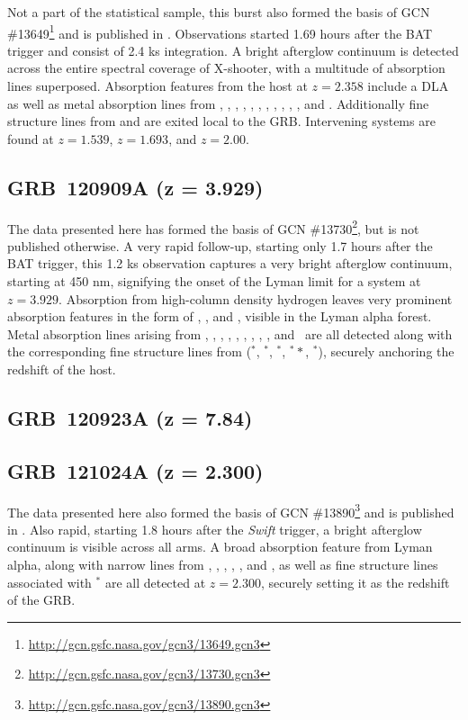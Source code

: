 \documentclass{aa}    %
\begin{document}
Not a part of the statistical sample, this burst also formed the basis of  GCN
\#13649\footnote{\url{http://gcn.gsfc.nasa.gov/gcn3/13649.gcn3}} and is
published in \citet{Kruhler2013}. Observations started 1.69 hours after the BAT
trigger and consist of 2.4 ks integration. A bright afterglow continuum is
detected across the entire spectral coverage of X-shooter, with a multitude of
absorption lines superposed. Absorption features from the host at $z = 2.358$
include a DLA as well as metal absorption lines from \nv, \sii, \SIii, \oi,
\civ, \SIiv, \feii, \alii, \aliii, \mnii, \mgii, and \mgi. Additionally fine
structure lines from \NIii and \feii are exited local to the GRB. Intervening
systems are found at $z = 1.539$, $z = 1.693$, and $z = 2.00$.

\subsection{GRB~120909A (z = 3.929)}

The data presented here has formed the basis of GCN
\#13730\footnote{\url{http://gcn.gsfc.nasa.gov/gcn3/13730.gcn3}}, but is not
published otherwise. A very rapid follow-up, starting only 1.7 hours after the
BAT trigger, this 1.2 ks observation captures a very bright afterglow continuum,
starting at 450 nm, signifying the onset of the Lyman limit for a system at $z =
3.929$. Absorption from high-column density hydrogen leaves very prominent
absorption features in the form of \lya, \lyb, and \lyg, visible in the Lyman
alpha forest. Metal absorption lines arising from \feii, \NIii, \SIii, \sii,
\alii, \aliii, \cii, \oi, \civ, and \znii~are all detected along with the
corresponding fine structure lines from (\feii$^*$, \SIii$^*$, \oi$^*$,
\oi$^**$, \cii$^*$), securely anchoring the redshift of the host.

\subsection{GRB~120923A (z = 7.84)}






\subsection{GRB~121024A (z = 2.300)}

The data presented here also formed the basis of GCN
\#13890\footnote{\url{http://gcn.gsfc.nasa.gov/gcn3/13890.gcn3}} and is
published in \citet{Friis2015}. Also rapid, starting 1.8 hours after the
\textit{Swift} trigger, a bright afterglow continuum is visible across all arms.
A broad absorption feature from Lyman alpha, along with narrow lines from \civ,
\SIii, \SIiv, \feii, \sii, and \alii, as well as fine structure lines associated
with \SIii$^*$ are all detected at $z = 2.300$, securely setting it as the
redshift of the GRB.
\end{document}
